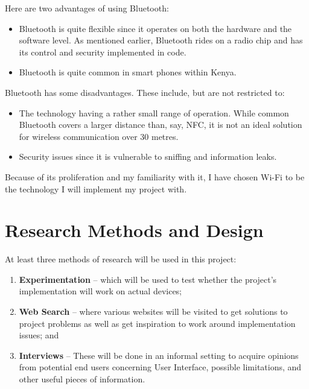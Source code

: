 \documentclass[12pt,svgnames,smaller]{article} %
\begin{document}
\begin{enumerate}
	Here are two advantages of using Bluetooth:
	
	\begin{itemize}
		\item Bluetooth is quite flexible since it operates on both the hardware and the software level. As mentioned earlier, Bluetooth rides on a radio chip and has its control and security implemented in code.
		\item Bluetooth is quite common in smart phones within Kenya. 
	\end{itemize}

	Bluetooth has some disadvantages. These include, but are not restricted to:
		
	\begin{itemize}
		\item The technology having a rather small range of operation. While common Bluetooth covers a larger distance than, say, NFC, it is not an ideal solution for wireless communication over 30 metres.
		\item Security issues since it is vulnerable to sniffing and information leaks.
	\end{itemize}
	
\end{enumerate}

Because of its proliferation and my familiarity with it, I have chosen Wi-Fi to be the technology I will implement my project with.



\section{\textbf{ Research Methods and Design } } 

At least three methods of research will be used in this project:

\begin{enumerate}
	\item \textbf{Experimentation} – which will be used to test whether the project’s implementation will work on actual devices;
	\item \textbf{Web Search} – where various websites will be visited to get solutions to project problems as well as get inspiration to work around implementation issues; and
	\item \textbf{Interviews} – These will be done in an informal setting to acquire opinions from potential end users concerning User Interface, possible limitations, and other useful pieces of information.
\end{enumerate}
\end{document}
